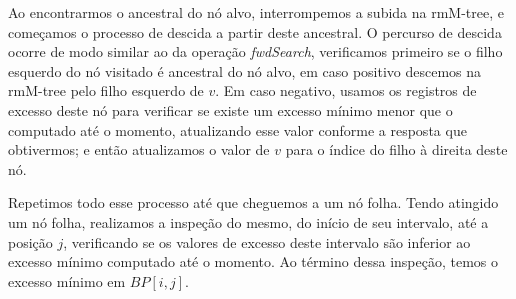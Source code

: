     Ao encontrarmos o ancestral do nó alvo, interrompemos a subida na rmM-tree, e começamos o processo de descida a partir deste ancestral. O percurso de descida ocorre de modo similar ao da operação \textit{fwdSearch}, verificamos primeiro se o filho  esquerdo do nó visitado é ancestral do nó alvo, em caso positivo descemos na rmM-tree pelo filho esquerdo de $v$.  Em caso negativo, usamos os registros de excesso deste nó para verificar se existe um excesso mínimo menor que o computado até o momento, atualizando esse valor conforme a resposta que obtivermos; e então atualizamos o valor de $v$ para o índice do filho à direita deste nó. 

    Repetimos todo esse processo até que cheguemos a um nó folha. Tendo atingido um nó folha, realizamos a inspeção do mesmo, do início de seu intervalo, até a posição $j$, verificando se os valores de excesso deste intervalo são inferior ao excesso mínimo computado até o momento. Ao término dessa inspeção, temos o excesso mínimo em $BP[i,j]$.


